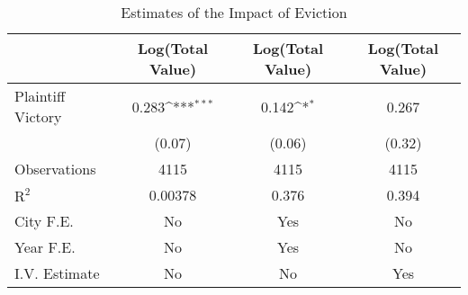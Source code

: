 \begin{table}[htbp]\centering
\def\sym#1{\ifmmode^{#1}\else\(^{#1}\)\fi}
\caption{Estimates of the Impact of Eviction}
\begin{tabular}{l*{3}{c}}
\toprule
                    &\multicolumn{1}{c}{Log(Total Value)}&\multicolumn{1}{c}{Log(Total Value)}&\multicolumn{1}{c}{Log(Total Value)}\\
\midrule
Plaintiff Victory   &       0.283\sym{***}&       0.142\sym{*}  &       0.267         \\
                    &      (0.07)         &      (0.06)         &      (0.32)         \\
\midrule
Observations        &        4115         &        4115         &        4115         \\
$\text{R}^2$        &     0.00378         &       0.376         &       0.394         \\
City F.E.           &          No         &         Yes         &          No         \\
Year F.E.           &          No         &         Yes         &          No         \\
I.V. Estimate       &          No         &          No         &         Yes         \\
\bottomrule
\end{tabular}
\end{table}
